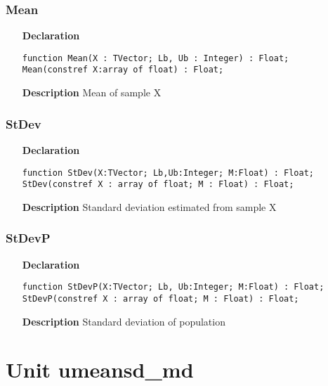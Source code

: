 \documentclass[12pt,a4paper,oneside]{report}
\newcommand{\lmath}[1]{   %
	\marginpar{\vspace{#1} 
		\begin{flushright}
			LMath
	\end{flushright} }
}
\newcommand{\declarationitem}[1]{\textbf{#1}}
\newcommand{\descriptiontitle}[1]{\textbf{#1}}
\newcommand{\code}[1]{\texttt{#1}}
\begin{document}
\subsubsection{Mean}
\label{umeansd-Mean}
\begin{itemize}\item[\declarationitem{Declaration}\hfill]
	\begin{flushleft}
		\code{function Mean(X : TVector; Lb, Ub : Integer) : Float;}\\
		\code{Mean(constref X:array of float) : Float;}
	\end{flushleft}
	\item[\descriptiontitle{Description}]
	Mean of sample X
\end{itemize}
\subsubsection{StDev}
\label{umeansd-StDev}
\begin{itemize}\item[\declarationitem{Declaration}\hfill]
	\begin{flushleft}
		\code{function StDev(X:TVector; Lb,Ub:Integer; M:Float) : Float;}\\
		\code{StDev(constref X : array of float; M : Float) : Float;}
	\end{flushleft}
	\item[\descriptiontitle{Description}]
	Standard deviation estimated from sample X
\end{itemize}
\subsubsection{StDevP}
\label{umeansd-StDevP}
\begin{itemize}\item[\declarationitem{Declaration}\hfill]
	\begin{flushleft}
		\code{function StDevP(X:TVector; Lb, Ub:Integer; M:Float) : Float;}\\
		\code{StDevP(constref X : array of float; M : Float) : Float;}
	\end{flushleft}
	\item[\descriptiontitle{Description}]
	Standard deviation of population
\end{itemize}
\section{Unit umeansd{\_}md}\lmath{-24pt}
\label{umeansd_md}
\end{document}
